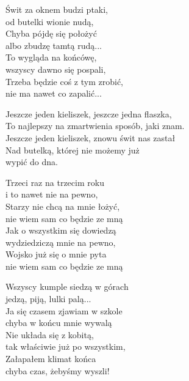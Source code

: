 \begin{text}
    Świt za oknem budzi ptaki,\\
    od butelki wionie nudą,\\
    Chyba pójdę się położyć\\
    albo zbudzę tamtą rudą...\\
    To wygląda na końcówę,\\
    wszyscy dawno się pospali,\\
    Trzeba będzie coś z tym zrobić,\\
    nie ma nawet co zapalić...

    \vin Jeszcze jeden kieliszek, jeszcze jedna flaszka,\\
    \vin To najlepszy na zmartwienia sposób, jaki znam.\\
    \vin Jeszcze jeden kieliszek, znowu świt nas zastał\\
    \vin Nad butelką, której nie możemy już\\
    \vin wypić do dna.

    Trzeci raz na trzecim roku\\
    i to nawet nie na pewno,\\
    Starzy nie chcą na mnie łożyć,\\
    nie wiem sam co będzie ze mną\\
    Jak o wszystkim się dowiedzą\\
    wydziedziczą mnie na pewno,\\
    Wojsko już się o mnie pyta\\
    nie wiem sam co będzie ze mną

    Wszyscy kumple siedzą w górach\\
    jedzą, piją, lulki palą...\\
    Ja się czasem zjawiam w szkole\\
    chyba w końcu mnie wywalą\\
    Nie układa się z kobitą,\\
    tak właściwie już po wszystkim,\\
    Załapałem klimat końca\\
    chyba czas, żebyśmy wyszli!
\end{text}
